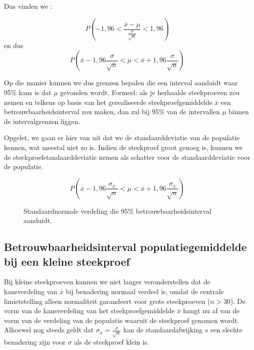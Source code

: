 {Dus vinden we :

\[ P( -1,96 < \frac{\overline{x} - \mu}{\frac{\sigma}{\sqrt{n}}} < 1,96 ) \]
en dus
\[ P ( \overline{x} -1,96 \frac{\sigma}{\sqrt{n}} <\mu < \overline{x} + 1,96 \frac{\sigma}{\sqrt{n}}) \]

Op die manier kunnen we dus grenzen bepalen die een interval aanduidt waar 95\% kans is dat $\mu$ gevonden wordt. Formeel: als je herhaalde steekproeven zou nemen en telkens op basis van het gerealiseerde steekproefgemiddelde $\overline{x}$ een betrouwbaarheidsinterval zou maken, dan zal bij 95\% van de intervallen $\mu$ binnen de intervalgrenzen liggen.

Opgelet, we gaan er hier van uit dat we de standaarddeviatie van de populatie kennen, wat meestal niet zo is. Indien de steekproef groot genoeg is, kunnen we de steekproefstandaarddeviatie nemen als schatter voor de standaarddeviatie voor de populatie.

\[ P ( \overline{x} -1,96 \frac{\sigma_{\overline{x}}}{\sqrt{n}} < \mu < \overline{x} + 1,96 \frac{\sigma_{\overline{x}}}{\sqrt{n}}) \]


\begin{figure}[t]
\centering
{}
\caption{Standaardnormale verdeling die 95\% betrouwbaarheidsinterval aanduidt.}
\label{fig:verdelingStandaardnormaal}
\end{figure}

\subsection{Betrouwbaarheidsinterval populatiegemiddelde bij een kleine steekproef}

Bij kleine steekproeven kunnen we niet langer veronderstellen dat de kansverdeling van $\overline{x}$ bij benadering
normaal verdeel is, omdat de centrale limietstelling alleen normaliteit garandeert voor grote steekproeven ($n >30$). De vorm
van de kansverdeling van het steekproefgemiddelde $\overline{x}$ hangt nu af van de vorm van de verdeling van de populatie waaruit de
steekproef genomen wordt. Alhoewel nog steeds geldt dat $\sigma_{\overline{x}} = \frac{\sigma}{\sqrt{n}}$ kan
de standaardafwijking $s$ een slechte benadering zijn voor $\sigma$ als de steekproef klein is.

}
